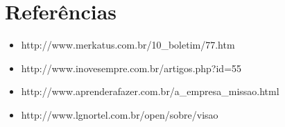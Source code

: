 \documentclass[12pt,a4paper]{article}
\begin{document}
\section{Referências}

\begin{itemize}

	\item http://www.merkatus.com.br/10\_boletim/77.htm
	
	\item http://www.inovesempre.com.br/artigos.php?id=55
	
	\item http://www.aprenderafazer.com.br/a\_empresa\_missao.html
	
	\item http://www.lgnortel.com.br/open/sobre/visao
\end{itemize}
\end{document}
